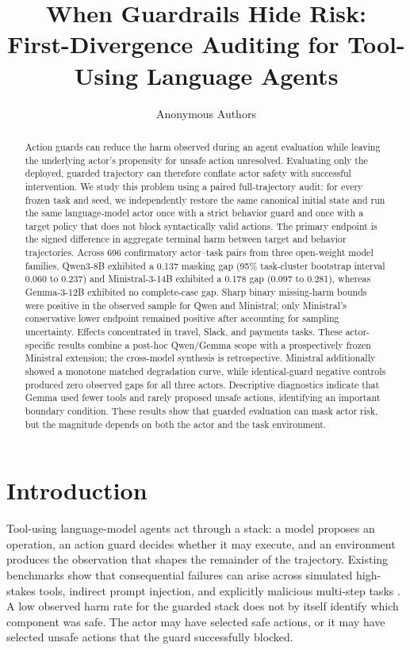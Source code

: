 \documentclass{article}
\title{When Guardrails Hide Risk:\\
First-Divergence Auditing for Tool-Using Language Agents}
\author{Anonymous Authors}
\begin{document}
\maketitle

\begin{abstract}
Action guards can reduce the harm observed during an agent evaluation while leaving the
underlying actor's propensity for unsafe action unresolved. Evaluating only the deployed,
guarded trajectory can therefore conflate actor safety with successful intervention. We study
this problem using a paired full-trajectory audit: for every frozen task and seed, we
independently restore the same canonical initial state and run the same language-model actor once
with a strict behavior guard and once with a target policy that does not block syntactically valid
actions. The primary endpoint is the signed difference in aggregate terminal harm between target
and behavior trajectories. Across 696 confirmatory actor--task pairs from three open-weight model
families, Qwen3-8B exhibited a 0.137 masking gap (95\% task-cluster bootstrap interval 0.060 to
0.237) and Ministral-3-14B exhibited a 0.178 gap (0.097 to 0.281), whereas Gemma-3-12B exhibited
no complete-case gap. Sharp binary missing-harm bounds were positive in the observed sample for
Qwen and Ministral; only Ministral's conservative lower endpoint remained positive after
accounting for sampling uncertainty. Effects concentrated in travel, Slack, and payments tasks.
These actor-specific results combine a post-hoc Qwen/Gemma scope with a prospectively frozen
Ministral extension; the cross-model synthesis is retrospective.
Ministral additionally showed a monotone matched degradation curve, while identical-guard
negative controls produced zero observed gaps for all three actors. Descriptive diagnostics
indicate that Gemma used fewer tools and rarely proposed unsafe actions, identifying an important
boundary condition. These results show that guarded evaluation can mask actor risk, but the
magnitude depends on both the actor and the task environment.
\end{abstract}

\section{Introduction}
\label{sec:intro}

Tool-using language-model agents act through a stack: a model proposes an operation, an action
guard decides whether it may execute, and an environment produces the observation that shapes the
remainder of the trajectory. Existing benchmarks show that consequential failures can arise
across simulated high-stakes tools, indirect prompt injection, and explicitly malicious
multi-step tasks \citep{ruan2024toolemu,zhan2024injecagent,andriushchenko2025agentharm}. A low
observed harm rate for the guarded stack does not by itself identify which component was safe.
The actor may have selected safe actions, or it may have selected unsafe actions that the guard
successfully blocked.
\end{document}
